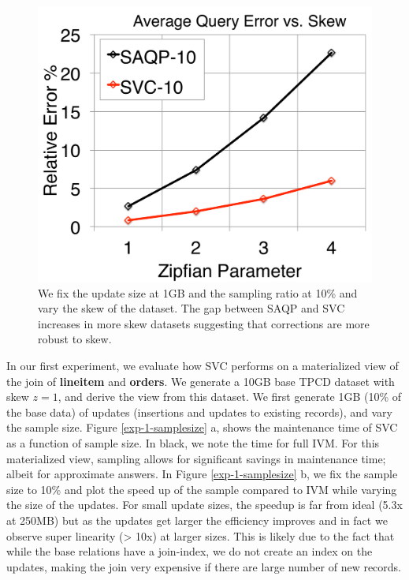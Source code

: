 \begin{figure}[t]
\centering
  \includegraphics[scale=0.15]{exp/msj_5.pdf}
 \caption{We fix the update size at 1GB and the sampling ratio at 10\% and vary the skew of the dataset. The gap between SAQP and SVC increases in more skew datasets suggesting that corrections are more robust to skew. \label{exp-1-zipf}}
\end{figure}

In our first experiment, we evaluate how SVC performs on a materialized view of the join of \textbf{lineitem} and \textbf{orders}.
We generate a 10GB base TPCD dataset with skew $z=1$, and derive the view from this dataset.
We first generate 1GB (10\% of the base data) of updates (insertions and updates to existing records), and vary the sample size.
Figure \ref{exp-1-samplesize} a, shows the maintenance time of SVC as a function of sample size.
In black, we note the time for full IVM.
For this materialized view, sampling allows for significant savings in maintenance time; albeit for approximate answers.
In Figure \ref{exp-1-samplesize} b, we fix the sample size to 10\% and plot the speed up of the sample compared to IVM while varying the size of the updates.
For small update sizes, the speedup is far from ideal (5.3x at 250MB) but as the updates get larger the efficiency improves and in fact we observe super linearity (> 10x) at larger sizes.
This is likely due to the fact that while the base relations have a join-index, we do not create an index on the updates, making the join very expensive if there are large number of new records.

